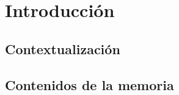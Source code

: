 %
%


\chapter{Introducción}
\setcounter{page}{1}

\section{Contextualización}

\section{Contenidos de la memoria}
	
%